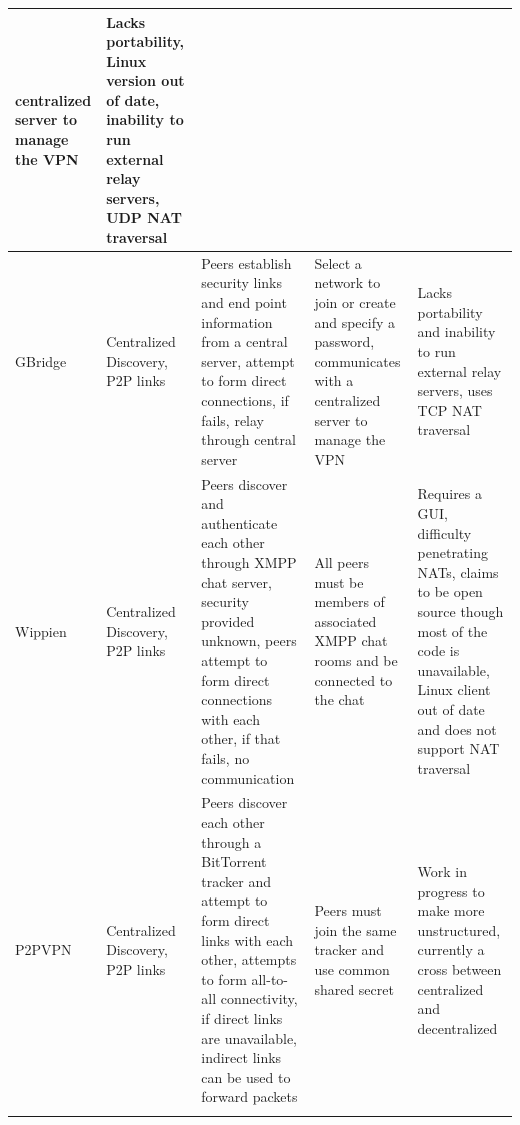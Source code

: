 \begin{center}
{{\begin{longtable}{p{.8in}p{1.15in}p{1.3in}p{1.25in}p{1.25in}}
centralized server to manage the VPN
&
Lacks portability, Linux version out of date, inability to run external relay
servers, UDP NAT traversal
\\ \hline
GBridge
&
Centralized Discovery, P2P links
&
Peers establish security links and end point information from a central
server, attempt to form direct connections, if fails, relay through central
server
&
Select a network to join or create and specify a password, communicates with a
centralized server to manage the VPN
&
Lacks portability and inability to run external relay servers, uses TCP NAT
traversal
\\ \hline
Wippien
&
Centralized Discovery, P2P links
&
Peers discover and authenticate each other through XMPP chat server, security
provided unknown, peers attempt to form direct connections with each other, if
that fails, no communication
&
All peers must be members of associated XMPP chat rooms and be connected to the
chat
&
Requires a GUI, difficulty penetrating NATs, claims to be open source though
most of the code is unavailable, Linux client out of date and does not support
NAT traversal
\\ \hline
P2PVPN
&
Centralized Discovery, P2P links
&
Peers discover each other through a BitTorrent tracker and attempt to form
direct links with each other, attempts to form all-to-all connectivity, if
direct links are unavailable, indirect links can be used to forward packets
&
Peers must join the same tracker and use common shared secret
&
Work in progress to make more unstructured, currently a cross between
centralized and decentralized
\\ \hline
\label{tab:virtual_networks}
\end{longtable} } }
\end{center}
